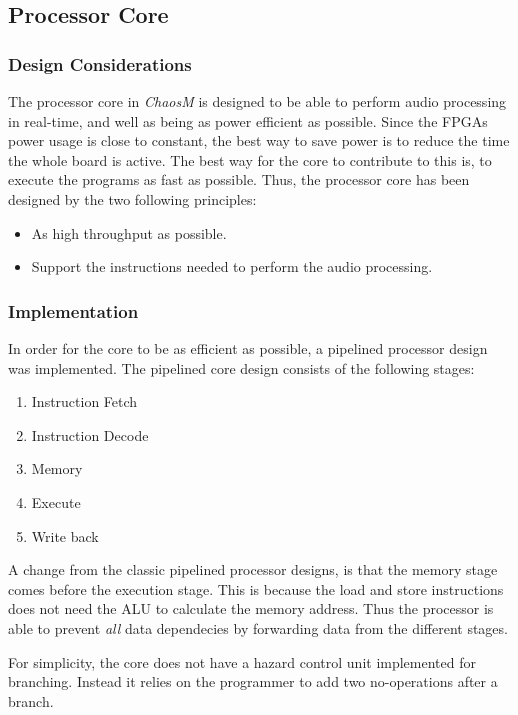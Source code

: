 \FloatBarrier
\subsection{Processor Core}\label{subsec:fpga-processor-core}

\subsubsection{Design Considerations}

The processor core in \textit{ChaosM} is designed to be able to perform audio processing in real-time, and well as being as power efficient as possible.
Since the FPGAs power usage is close to constant, the best way to save power is to reduce the time the whole board is active.
The best way for the core to contribute to this is, to execute the programs as fast as possible.
Thus, the processor core has been designed by the two following principles:

\begin{itemize}
	\item As high throughput as possible.
	\item Support the instructions needed to perform the audio processing.
\end{itemize}

\subsubsection{Implementation}

In order for the core to be as efficient as possible, a pipelined processor
design was implemented. The pipelined core design consists of the following
stages:

\begin{enumerate}
	\item Instruction Fetch \label{stage:if}
	\item Instruction Decode \label{stage:id}
	\item Memory \label{stage:mem}
	\item Execute \label{stage:ex}
	\item Write back \label{stage:wb}
\end{enumerate}

A change from the classic pipelined processor designs, is that the memory stage comes before the execution stage.
This is because the load and store instructions does not need the ALU to calculate the memory address.
Thus the processor is able to prevent \textit{all} data dependecies by forwarding data from the different stages.

For simplicity, the core does not have a hazard control unit implemented for branching.
Instead it relies on the programmer to add two no-operations after a branch.


